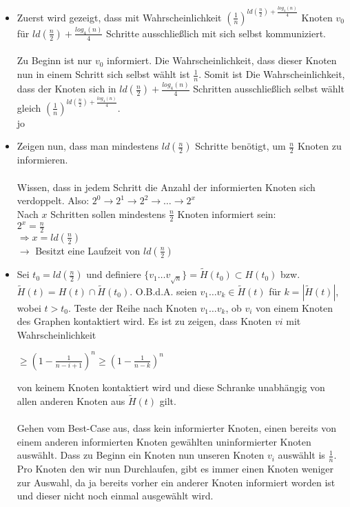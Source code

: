 \documentclass[12pt,a4paper]{report}
\begin{document}
\begin{itemize}
	\item Zuerst wird gezeigt, dass mit	Wahrscheinlichkeit $(\frac{1}{n})^{ld(\frac{n}{2})+\frac{log_4(n)}{4}}$ Knoten $v_0$ für $ld(\frac{n}{2})+\frac{log_4(n)}{4}$ Schritte ausschließlich mit sich selbst kommuniziert.\\
	\\
	Zu Beginn ist nur $v_0$ informiert. Die Wahrscheinlichkeit, dass dieser Knoten nun in einem Schritt sich selbst wählt ist $\frac{1}{n}$. Somit ist Die Wahrscheinlichkeit, dass der Knoten sich in  $ld(\frac{n}{2})+\frac{log_4(n)}{4}$ Schritten ausschließlich selbst wählt gleich $(\frac{1}{n})^{ld(\frac{n}{2})+\frac{log_4(n)}{4}}$.\\jo
	\item Zeigen nun, dass man mindestens $ld(\frac{n}{2})$ Schritte benötigt, um $\frac{n}{2}$ Knoten zu informieren.\\
	\\
	Wissen, dass in jedem Schritt die Anzahl der informierten Knoten sich verdoppelt.
	Also: $2^0 \rightarrow 2^1 \rightarrow 2^2 \rightarrow \dots \rightarrow 2^x$\\
	Nach $x$ Schritten sollen mindestens $\frac{n}{2}$ Knoten informiert sein:\\
	$2^x = \frac{n}{2}$\\
	$\Rightarrow x = ld(\frac{n}{2})$\\
	$\rightarrow$ Besitzt eine Laufzeit von $ld(\frac{n}{2})$\\
	\item Sei $t_0 = ld(\frac{n}{2})$ und definiere $\{v_1 \dots v_{\sqrt{n}}\} = \tilde{H}(t_0) \subset H(t_0)$ bzw. \\
	$\tilde{H}(t) = H(t) \cap \tilde{H}(t_0)$. O.B.d.A. seien $v_1 \dots v_k \in \tilde{H}(t)$ für $k=|\tilde{H}(t)|$, wobei $t>t_0$. Teste der Reihe nach Knoten $v_1 \dots v_k$, ob $v_i$ von einem Knoten des Graphen kontaktiert wird. Es ist zu zeigen, dass Knoten $vi$ mit Wahrscheinlichkeit
	\begin{center}
		$ \ge (1-\frac{1}{n-i+1})^n \ge (1-\frac{1}{n-k})^n$
	\end{center}
	von keinem Knoten kontaktiert wird und diese Schranke unabhängig von allen anderen Knoten aus $\tilde{H}(t)$ gilt.\\
	\\
	Gehen vom Best-Case aus, dass kein informierter Knoten, einen bereits von einem anderen informierten Knoten gewählten uninformierter Knoten auswählt. Dass zu Beginn ein Knoten  nun unseren Knoten $v_i$ auswählt is $\frac{1}{n}$. Pro Knoten den wir nun Durchlaufen, gibt es immer einen Knoten weniger zur Auswahl, da ja bereits vorher ein anderer Knoten informiert worden ist und dieser nicht noch einmal ausgewählt wird.

\end{itemize}
\end{document}
